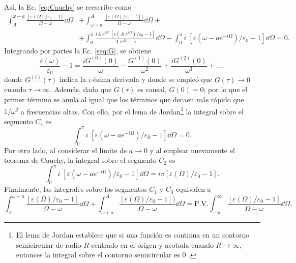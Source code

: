 %
Así, la Ec. \eqref{eq:Cauchy} se reescribe como
\begin{align*}
	\int_A^{\omega-a}\frac{[\varepsilon(\Omega)/\varepsilon_0-1]}{\Omega-\omega}\dd{\Omega}&+	\int_{\omega+a}^{A}\frac{[\varepsilon(\Omega)/\varepsilon_0-1])}{\Omega-\omega}\dd{\Omega}+\\
	&+	\int_0^{\pi}\frac{iA\;e^{i\Omega}\; [\varepsilon(A\;e^{i\Omega})/\varepsilon_0-1]}{A\;e^{i\Omega}-\omega}\dd{\Omega}-\int_0^{\pi}i\;[\varepsilon(\omega-ae^{-i\Omega})/\varepsilon_0-1]\dd{\Omega}=0.
\end{align*}
Integrando por partes la Ec. \eqref{seq:G}, se obtiene  
%
\begin{equation*}
	\frac{\varepsilon(\omega)}{\varepsilon_0}-1=\frac{i G^{(0)}(0)}{\omega}-\frac{ G^{(1)}(0)}{\omega^2}+\frac{i G^{(2)}(0)}{\omega^3}+...,
\end{equation*}
%
donde $G^{(i)}(\tau)$ indica la $i$-ésima derivada y donde se empleó que $G(\tau)\rightarrow 0$ cuando $\tau\rightarrow \infty$. Además, dado que $G(\tau)$ es causal, $G(0)=0$; por lo que el primer término se anula al igual que los términos que decaen más rápido que $1/\omega^2$ a frecuencias altas. Con ello, por el lema de Jordan\footnote{El lema de Jordan establece que si una función es continua en un contorno semicircular de radio $R$ centrado en el origen y acotada cuando $R\rightarrow \infty$, entonces la integral sobre el contorno semicircular es 0 \cite{arfkenMathematicalMethodsPhysicists2011}. } la integral sobre el segmento $C_4$ es \cite{bohrenAbsorptionScatteringLight2008}
%
\begin{equation}
	\int_0^{\pi}i\;[\varepsilon(\omega-ae^{-i\Omega})/\varepsilon_0-1]\dd{\Omega}=0.
\end{equation}
%
 Por otro lado, al considerar el límite de $a\to 0$ y al emplear nuevamente el teorema de Cauchy, la integral sobre el segmento $C_2$ es \cite{jacksonClassicalElectrodynamics2021} 
 \begin{equation*}
	\int_0^{\pi}i\;[\varepsilon(\omega-ae^{-i\Omega})/\varepsilon_0-1]\dd{\Omega}=i\pi[\varepsilon(\Omega)/\varepsilon_0-1].
 \end{equation*}
 Finalmente, las integrales sobre los segmentos $C_1$ y $C_3$ equivalen a 
%
\begin{equation}
		\int_A^{\omega-a}\frac{[\varepsilon(\Omega)/\varepsilon_0-1]}{\Omega-\omega}\dd{\Omega}+	\int_{\omega+a}^{A}\frac{[\varepsilon(\Omega)/\varepsilon_0-1])}{\Omega-\omega}\dd{\Omega}=\text{P.V.}\int_{-\infty}^{\infty}\frac{[\varepsilon(\Omega)/\varepsilon_0-1]}{\Omega-\omega} \dd{\Omega},
\end{equation}
